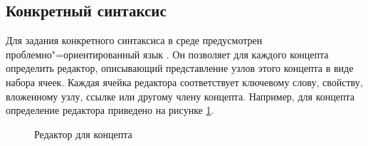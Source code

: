 \subsection{Конкретный синтаксис}
Для задания конкретного синтаксиса в среде \MPS{} предусмотрен проблемно"=ориентированный язык . Он позволяет для каждого концепта определить редактор, описывающий представление узлов этого концепта в виде набора ячеек. Каждая ячейка редактора соответствует ключевому слову, свойству, вложенному узлу, ссылке или другому члену концепта. Например, для концепта  определение редактора приведено на рисунке \ref{fig:StateMachineEditor}.

\begin{figure}
 \centering
 \caption{Редактор для концепта }
 \label{fig:StateMachineEditor}
\end{figure}

